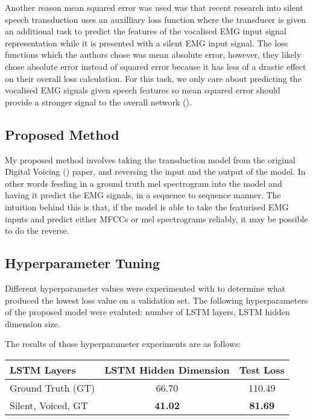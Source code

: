 Another
reason mean squared error was used was that recent research into
silent speech transduction uses an auxilliary loss function where the
transducer is given an additional task to predict the features of
the vocalised EMG input signal representation while it is presented
with a silent EMG input signal. The loss functions which the authors
chose was mean absolute error, however, they likely chose absolute
error instead of squared error because it has less of a drastic
effect on their overall loss calculation. For this task, we only
care about predicting the vocalised EMG signals given speech features
so mean squared error should provide a stronger signal to the overall
network (\cite{silent_speech_tonal}).

\subsection{Proposed Method}

My proposed method involves taking the transduction model from
the original Digital Voicing (\cite{gaddy2020digital}) paper,
and reversing the input and the output of the model.
In other words feeding in a ground truth mel spectrogram into the
model and having it predict the EMG signals, in a sequence to
sequence manner.
The intuition
behind this is that, if the model is able to take the featurised
EMG inputs and predict either MFCCs or mel spectrograms reliably,
it may be possible to do the reverse.

\subsection{Hyperparameter Tuning}

Different hyperparameter values were experimented with to determine what
produced the lowest loss value on a validation set. The following
hyperparameters of the proposed model were evaluted:
number of LSTM layers, LSTM hidden dimension size.

The results of those hyperparameter experiments are as follows:

{\small\begin{center}
    \begin{tabular} {  l  c | c  }
    \hline
    \textbf{LSTM Layers} & \textbf{LSTM Hidden Dimension} & \textbf{Test Loss} \\
    \hline
    Ground Truth (GT) & 66.70 & 110.49 \\
    Silent, Voiced, GT & \textbf{41.02} & \textbf{81.69} \\
    \hline
    \end{tabular}
\end{center}}

